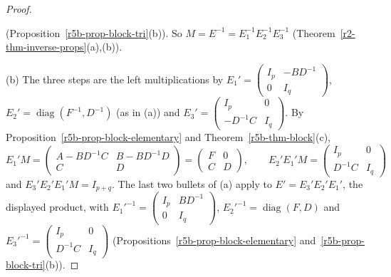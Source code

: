 \documentclass[12pt]{article}
\DeclareMathOperator{\diag}{diag}
\theoremstyle{definition}
\begin{document}
\begin{proof}
\begin{itemize}
(Proposition~\ref{r5b-prop-block-tri}(b)). So \(M=E^{-1}=E_1^{-1}E_2^{-1}E_3^{-1}\)
(Theorem~\ref{r2-thm-inverse-props}(a),(b)).
\end{itemize}
(b) The three steps are the left multiplications by
\(E_1'=\left(\begin{smallmatrix}I_p&-BD^{-1}\\0&I_q\end{smallmatrix}\right)\),
\(E_2'=\diag(F^{-1},D^{-1})\) (as in (a)) and \(E_3'=\left(\begin{smallmatrix}I_p&0\\-D^{-1}C&I_q\end{smallmatrix}\right)\).
By Proposition~\ref{r5b-prop-block-elementary} and Theorem~\ref{r5b-thm-block}(c),
\[
E_1'M=\begin{pmatrix}A-BD^{-1}C&B-BD^{-1}D\\C&D\end{pmatrix}=\begin{pmatrix}F&0\\C&D\end{pmatrix},\qquad
E_2'E_1'M=\begin{pmatrix}I_p&0\\D^{-1}C&I_q\end{pmatrix}
\]
and \(E_3'E_2'E_1'M=I_{p+q}\). The last two bullets of (a) apply to \(E'=E_3'E_2'E_1'\), the displayed
product, with \(E_1'^{-1}=\left(\begin{smallmatrix}I_p&BD^{-1}\\0&I_q\end{smallmatrix}\right)\),
\(E_2'^{-1}=\diag(F,D)\) and \(E_3'^{-1}=\left(\begin{smallmatrix}I_p&0\\D^{-1}C&I_q\end{smallmatrix}\right)\)
(Propositions~\ref{r5b-prop-block-elementary} and~\ref{r5b-prop-block-tri}(b)).
\end{proof}
\end{document}
